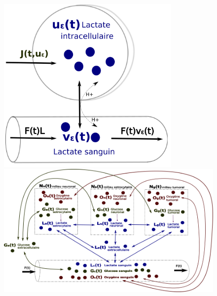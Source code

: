 \documentclass[a4paper, 12pt, twoside, openright]{article}
\begin{document}
\begin{itemize}
\begin{itemize}
\begin{figure}[!htbp]
\centering
\begin{minipage}{0.3\textwidth}
  \centering
\includegraphics[width=0.8\textwidth]{dessin.png}
\end{minipage}
\hspace{-0.5cm}
\begin{minipage}{0.35\textwidth}
  \centering
\includegraphics[width=1.05\textwidth]{dessin2.png}
\end{minipage}
\hspace{0.2cm}
\begin{minipage}{0.3\textwidth}
\centering

\end{minipage}
\end{figure}
\end{itemize}
\end{itemize}
\end{document}
